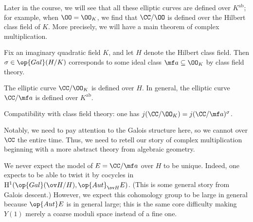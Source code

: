 \documentclass[../notes.tex]{subfiles}
\begin{document}
Later in the course, we will see that all these elliptic curves are defined over $K^{\mathrm{ab}}$; for example, when $\OO=\OO_K$, we find that $\CC/\OO$ is defined over the Hilbert class field of $K$. More precisely, we will have a main theorem of complex multiplication.
\begin{theorem} \label{thm:main-cm}
	Fix an imaginary quadratic field $K$, and let $H$ denote the Hilbert class field. Then $\sigma\in\op{Gal}(H/K)$ corresponds to some ideal class $\mf a\subseteq\OO_K$ by class field theory.
	\begin{listalph}
		\item The elliptic curve $\CC/\OO_K$ is defined over $H$. In general, the elliptic curve $\CC/\mf a$ is defined over $K^{\mathrm{ab}}$.
		\item Compatibility with class field theory: one has $j(\CC/\OO_K)=j(\CC/\mf a)^\sigma$.
	\end{listalph}
\end{theorem}
Notably, we need to pay attention to the Galois structure here, so we cannot over $\CC$ the entire time. Thus, we need to retell our story of complex multiplication beginning with a more abstract theory from algebraic geometry.
\begin{remark}
	We never expect the model of $E=\CC/\mf a$ over $H$ to be unique. Indeed, one expects to be able to twist it by cocycles in $\mathrm H^1(\op{Gal}(\ov H/H),\op{Aut}_{\ov H}E)$. (This is some general story from Galois descent.) However, we expect this cohomology group to be large in general because $\op{Aut}E$ is in general large; this is the same core difficulty making $Y(1)$ merely a coarse moduli space instead of a fine one.
\end{remark}
\end{document}
